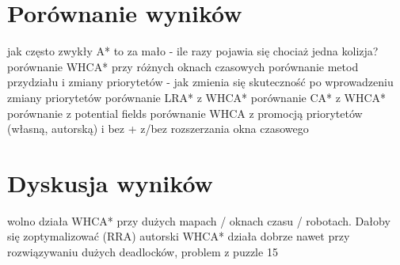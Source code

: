 \section{Porównanie wyników}
jak często zwykły A* to za mało - ile razy pojawia się chociaż jedna kolizja?
porównanie WHCA* przy różnych oknach czasowych
porównanie metod przydziału i zmiany priorytetów - jak zmienia się skuteczność  po wprowadzeniu zmiany priorytetów
porównanie LRA* z WHCA*
porównanie CA* z WHCA*
porównanie z potential fields
porównanie WHCA z promocją priorytetów (własną, autorską) i bez + z/bez rozszerzania okna czasowego

\section{Dyskusja wyników}
wolno działa WHCA* przy dużych mapach / oknach czasu / robotach. Dałoby się zoptymalizować (RRA)
autorski WHCA* działa dobrze nawet przy rozwiązywaniu dużych deadlocków, problem z puzzle 15
